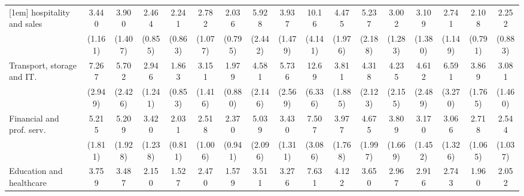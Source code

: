 {\begin{tabular}{l*{16}{c}}
[1em]
hospitality and sales&       3.440\sym{***}&       3.900\sym{***}&       2.464\sym{**} &       2.241\sym{*}  &       2.782\sym{**} &       2.036         &       5.928\sym{***}&       3.937\sym{***}&       10.16\sym{***}&       4.475\sym{***}&       5.237\sym{***}&       3.002\sym{*}  &       3.109\sym{*}  &       2.741\sym{*}  &       2.108\sym{*}  &       2.252\sym{*}  \\
                    &     (1.161)         &     (1.407)         &     (0.855)         &     (0.863)         &     (1.077)         &     (0.795)         &     (2.442)         &     (1.479)         &     (4.141)         &     (1.976)         &     (2.188)         &     (1.283)         &     (1.380)         &     (1.149)         &     (0.791)         &     (0.883)         \\
[1em]
Transport, storage and IT.&       7.267\sym{***}&       5.702\sym{***}&       2.946\sym{*}  &       1.863         &       3.151\sym{*}  &       1.979         &       4.581\sym{**} &       5.736\sym{***}&       12.69\sym{***}&       3.811\sym{**} &       4.318\sym{**} &       4.235\sym{**} &       4.612\sym{**} &       6.591\sym{***}&       3.869\sym{**} &       3.081\sym{*}  \\
                    &     (2.949)         &     (2.426)         &     (1.241)         &     (0.853)         &     (1.416)         &     (0.880)         &     (2.146)         &     (2.569)         &     (6.336)         &     (1.885)         &     (2.123)         &     (2.155)         &     (2.489)         &     (3.270)         &     (1.765)         &     (1.460)         \\
[1em]
Financial and prof. serv.&       5.215\sym{***}&       5.209\sym{***}&       3.420\sym{***}&       2.031         &       2.518\sym{*}  &       2.370\sym{*}  &       5.039\sym{***}&       3.430\sym{**} &       7.507\sym{***}&       3.977\sym{**} &       4.675\sym{***}&       3.809\sym{**} &       3.170\sym{*}  &       3.066\sym{**} &       2.718\sym{*}  &       2.544\sym{*}  \\
                    &     (1.811)         &     (1.928)         &     (1.238)         &     (0.811)         &     (1.006)         &     (0.941)         &     (2.096)         &     (1.311)         &     (3.086)         &     (1.768)         &     (1.997)         &     (1.669)         &     (1.452)         &     (1.326)         &     (1.065)         &     (1.037)         \\
[1em]
Education and healthcare&       3.759\sym{***}&       3.487\sym{***}&       2.150\sym{*}  &       1.527         &       2.470\sym{*}  &       1.579         &       3.511\sym{**} &       3.276\sym{**} &       7.631\sym{***}&       4.122\sym{**} &       3.650\sym{**} &       2.967\sym{*}  &       2.916\sym{*}  &       2.743\sym{*}  &       1.960         &       2.052         \\

\end{tabular}}
